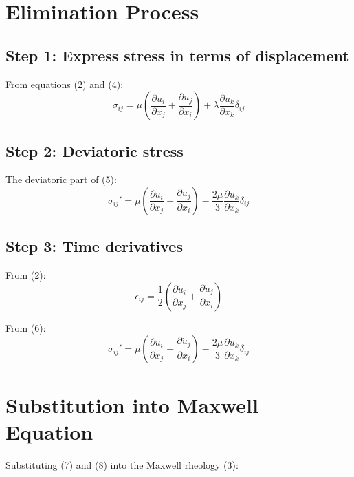 \documentclass{article}
\begin{document}
\section{Elimination Process}

\subsection{Step 1: Express stress in terms of displacement}

From equations (2) and (4):
\begin{equation}
\sigma_{ij} = \mu\left(\frac{\partial u_i}{\partial x_j} + \frac{\partial u_j}{\partial x_i}\right) + \lambda\frac{\partial u_k}{\partial x_k}\delta_{ij}
\end{equation}

\subsection{Step 2: Deviatoric stress}

The deviatoric part of (5):
\begin{equation}
\sigma_{ij}' = \mu\left(\frac{\partial u_i}{\partial x_j} + \frac{\partial u_j}{\partial x_i}\right) - \frac{2\mu}{3}\frac{\partial u_k}{\partial x_k}\delta_{ij}
\end{equation}

\subsection{Step 3: Time derivatives}

From (2):
\begin{equation}
\dot{\epsilon}_{ij} = \frac{1}{2}\left(\frac{\partial \dot{u}_i}{\partial x_j} + \frac{\partial \dot{u}_j}{\partial x_i}\right)
\end{equation}

From (6):
\begin{equation}
\dot{\sigma}_{ij}' = \mu\left(\frac{\partial \dot{u}_i}{\partial x_j} + \frac{\partial \dot{u}_j}{\partial x_i}\right) - \frac{2\mu}{3}\frac{\partial \dot{u}_k}{\partial x_k}\delta_{ij}
\end{equation}

\section{Substitution into Maxwell Equation}

Substituting (7) and (8) into the Maxwell rheology (3):
\end{document}
